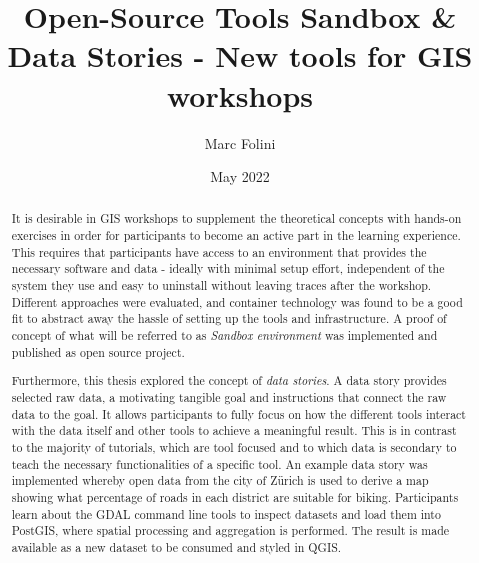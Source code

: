 \documentclass[11pt, a4paper, oneside, parskip=full-]{scrartcl}
\title{Open-Source Tools Sandbox \& Data Stories - New tools for GIS workshops}
\author{Marc Folini}
\date{May 2022}
\begin{document}
\begin{titlepage}
  \setcounter{page}{1}
  \clearpage\maketitle
  \thispagestyle{empty}
  \begin{abstract}
    It is desirable in GIS workshops to supplement the theoretical concepts with
    hands-on exercises in order for participants to become an active part in the
    learning experience. This requires that participants have access to an
    environment that provides the necessary software and data - ideally with
    minimal setup effort, independent of the system they use and easy to
    uninstall without leaving traces after the workshop. Different approaches
    were evaluated, and container technology was found to be a good fit to
    abstract away the hassle of setting up the tools and infrastructure. A proof
    of concept of what will be referred to as \emph{Sandbox environment} was
    implemented and published as open source project.

    Furthermore, this thesis explored the concept of \emph{data stories}. A data
    story provides selected raw data, a motivating tangible goal and
    instructions that connect the raw data to the goal. It allows participants
    to fully focus on how the different tools interact with the data itself and
    other tools to achieve a meaningful result. This is in contrast to the
    majority of tutorials, which are tool focused and to which data is secondary
    to teach the necessary functionalities of a specific tool. An example data
    story was implemented whereby open data from the city of Zürich is used to
    derive a map showing what percentage of roads in each district are suitable
    for biking. Participants learn about the GDAL command line tools to inspect
    datasets and load them into PostGIS, where spatial processing and
    aggregation is performed. The result is made available as a new dataset to
    be consumed and styled in QGIS.
  \end{abstract}
\end{titlepage}

\newpage
\tableofcontents

\newpage
{}
\setcounter{page}{1}
\end{document}
